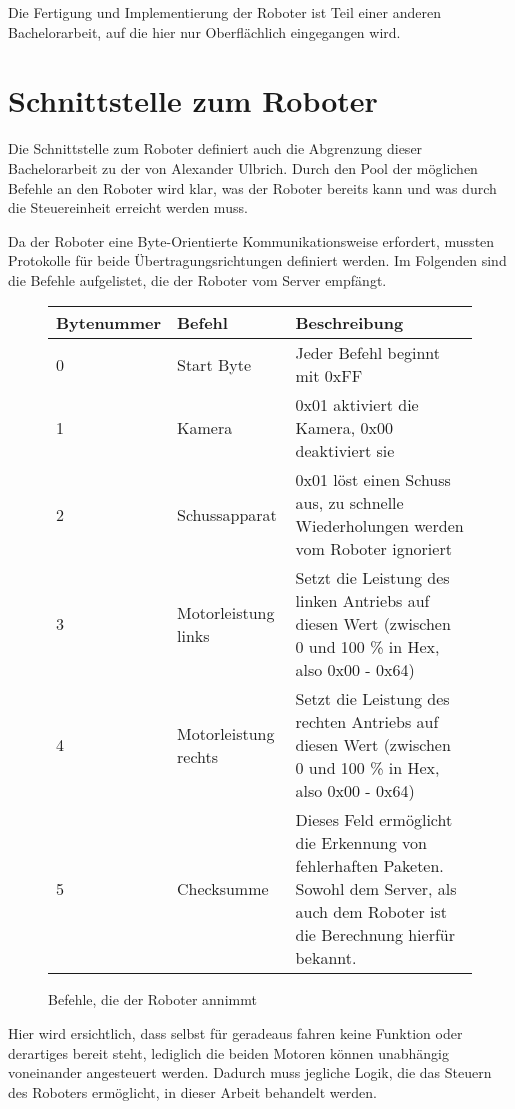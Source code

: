 Die Fertigung und Implementierung der Roboter ist Teil einer anderen Bachelorarbeit, auf die hier nur Oberflächlich eingegangen wird.               



\section{Schnittstelle zum Roboter}
\label{sec:schnittstelle}
Die Schnittstelle zum Roboter definiert auch die Abgrenzung dieser Bachelorarbeit zu der von Alexander Ulbrich. Durch den Pool der möglichen Befehle an den Roboter wird klar, was der Roboter bereits kann und was durch die Steuereinheit erreicht werden muss. 

Da der Roboter eine Byte-Orientierte Kommunikationsweise erfordert, mussten Protokolle für beide Übertragungsrichtungen definiert werden.
Im Folgenden sind die Befehle aufgelistet, die der Roboter vom Server empfängt. \\

\begin{figure}[!h]
\begin{tabular}{||p{}||p{}||p{}||}
	\hline Bytenummer & Befehl & Beschreibung \\ 
	\hline 0 & Start Byte &  Jeder Befehl beginnt mit 0xFF\\ 
	\hline 1 & Kamera & 0x01 aktiviert die Kamera, 0x00 deaktiviert sie \\ 
	\hline 2 & Schussapparat & 0x01 löst einen Schuss aus, zu schnelle Wiederholungen werden vom Roboter ignoriert \\ 
	\hline 3 & Motorleistung links & Setzt die Leistung des linken Antriebs auf diesen Wert (zwischen 0 und 100 \% in Hex, also 0x00 - 0x64) \\ 
	\hline 4 & Motorleistung rechts & Setzt die Leistung des rechten Antriebs auf diesen Wert (zwischen 0 und 100 \% in Hex, also 0x00 - 0x64) \\ 
	\hline 5 & Checksumme & Dieses Feld ermöglicht die Erkennung von fehlerhaften Paketen. Sowohl dem Server, als auch dem Roboter ist die Berechnung hierfür bekannt. \\
	\hline
\end{tabular}  
\caption{Befehle, die der Roboter annimmt}
\label{tab:serv_to_robot}
\end{figure}


Hier wird ersichtlich, dass selbst für geradeaus fahren keine Funktion oder derartiges bereit steht, lediglich die beiden Motoren können unabhängig voneinander angesteuert werden. Dadurch muss jegliche Logik, die das Steuern des Roboters ermöglicht, in dieser Arbeit behandelt werden. \\


